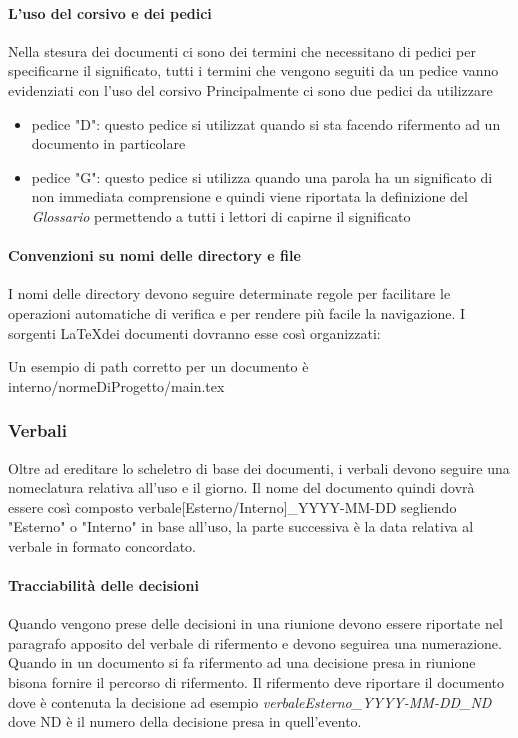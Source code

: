   \paragraph{L'uso del corsivo e dei pedici}
  Nella stesura dei documenti ci sono dei termini che necessitano di pedici per
  specificarne il significato, tutti i termini che vengono seguiti da un pedice
  vanno evidenziati con l'uso del corsivo
  Principalmente ci sono due pedici da utilizzare
    \begin{itemize}
      \item pedice "D": questo pedice si utilizzat quando si sta facendo rifermento
      ad un documento in particolare
      \item pedice "G": questo pedice si utilizza quando una parola ha un significato
      di non immediata comprensione e quindi viene riportata la definizione del
      \textit{Glossario}\doc
      permettendo a tutti i lettori di capirne il significato
    \end{itemize}

  \paragraph{Convenzioni su nomi delle directory e file}
  I nomi delle directory devono seguire determinate regole per facilitare le operazioni
  automatiche di verifica e per rendere più facile la navigazione.
  I sorgenti \LaTeX \space dei documenti dovranno esse così organizzati:


  Un esempio di path corretto per un documento è interno/normeDiProgetto/main.tex
  \subsubsection{Verbali}
  Oltre ad ereditare lo scheletro di base dei documenti, i verbali devono seguire
  una nomeclatura relativa all'uso e il giorno.
  Il nome del documento quindi dovrà essere così composto
  verbale[Esterno/Interno]\_YYYY-MM-DD segliendo "Esterno" o "Interno" in base
  all'uso, la parte successiva è la data relativa al verbale in formato concordato.

    \paragraph{Tracciabilità delle decisioni}
      Quando vengono prese delle decisioni in una riunione devono essere
      riportate nel paragrafo apposito del verbale di rifermento e devono
      seguirea una numerazione.
      Quando in un documento si fa rifermento ad una decisione presa in riunione
      bisona fornire il percorso di rifermento.
      Il rifermento deve riportare il documento dove è contenuta la decisione
      ad esempio \textit{verbaleEsterno\_YYYY-MM-DD\_ND} dove ND è il numero della
      decisione presa in quell'evento.


